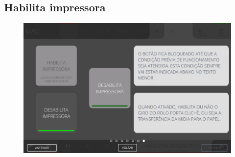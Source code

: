 \newpage
\thispagestyle{fancy}
\vspace*{40 pt}
\subsection{Habilita impressora}
\vspace*{\fill}
\begin{figure}[h]
    \centering
    \includegraphics[width=576 px,height=360 px]{src/imagesICV/04-printters/02-printter/commands/7.png}
\end{figure}
\vspace*{\fill}
